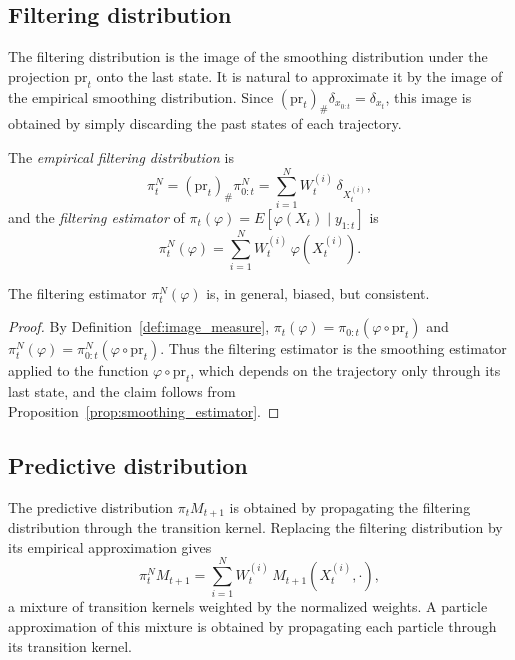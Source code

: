 \subsection{Filtering distribution}
\label{sec:filtering_distribution}
The filtering distribution is the image of the smoothing distribution under the projection $\mathrm{pr}_t$ onto the last state. It is natural to approximate it by the image of the empirical smoothing distribution. Since $(\mathrm{pr}_t)_\#\delta_{x_{0:t}} = \delta_{x_t}$, this image is obtained by simply discarding the past states of each trajectory.

\begin{definition}
    \label{def:filtering_estimator}
    The \emph{empirical filtering distribution} is
    \begin{equation}
        \pi_t^N = (\mathrm{pr}_t)_\#\pi_{0:t}^N = \sum_{i=1}^{N}W_t^{(i)}\,\delta_{X_t^{(i)}},
        \label{eq:empirical_filtering_distribution}
    \end{equation}
    and the \emph{filtering estimator} of $\pi_t(\varphi) = E[\varphi(X_t)\mid y_{1:t}]$ is
    \begin{equation}
        \pi_t^N(\varphi) = \sum_{i=1}^{N}W_t^{(i)}\,\varphi(X_t^{(i)}).
    \end{equation}
\end{definition}

\begin{proposition}
    \label{prop:filtering_estimator}
    The filtering estimator $\pi_t^N(\varphi)$ is, in general, biased, but consistent.
\end{proposition}
\begin{proof}
    By Definition~\ref{def:image_measure}, $\pi_t(\varphi) = \pi_{0:t}(\varphi\circ\mathrm{pr}_t)$ and $\pi_t^N(\varphi) = \pi_{0:t}^N(\varphi\circ\mathrm{pr}_t)$. Thus the filtering estimator is the smoothing estimator applied to the function $\varphi\circ\mathrm{pr}_t$, which depends on the trajectory only through its last state, and the claim follows from Proposition~\ref{prop:smoothing_estimator}.
\end{proof}

\subsection{Predictive distribution}
\label{sec:predictive_distribution}
The predictive distribution $\pi_tM_{t+1}$ is obtained by propagating the filtering distribution through the transition kernel. Replacing the filtering distribution by its empirical approximation gives
\begin{equation}
    \pi_t^NM_{t+1} = \sum_{i=1}^{N}W_t^{(i)}\,M_{t+1}(X_t^{(i)},\cdot),
\end{equation}
a mixture of transition kernels weighted by the normalized weights. A particle approximation of this mixture is obtained by propagating each particle through its transition kernel.

